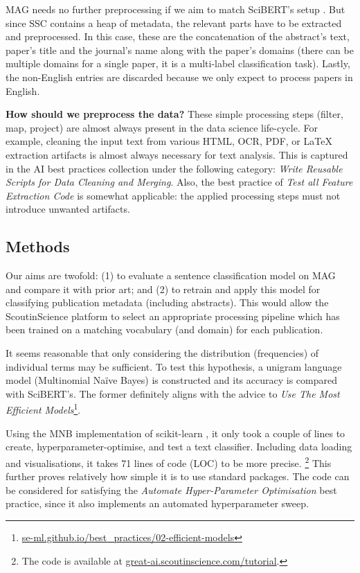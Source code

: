 MAG needs no further preprocessing if we aim to match SciBERT's setup \cite{beltagy2019scibert}. But since SSC contains a heap of metadata, the relevant parts have to be extracted and preprocessed. In this case, these are the concatenation of the abstract's text, paper's title and the journal's name along with the paper's domains (there can be multiple domains for a single paper, it is a multi-label classification task). Lastly, the non-English entries are discarded because we only expect to process papers in  English.

\begin{displayquote}
\textbf{How should we preprocess the data?} These simple processing steps (filter, map, project) are almost always present in the data science life-cycle. For example, cleaning the input text from various HTML, OCR, PDF, or \LaTeX \hskip 0.12cm extraction artifacts is almost always necessary for text analysis. This is captured in the AI best practices collection under the following category: \textit{Write Reusable Scripts for Data Cleaning and Merging}. Also, the best practice of \textit{Test all Feature Extraction Code} is somewhat applicable: the applied processing steps must not introduce unwanted artifacts.
\end{displayquote}

\subsection{Methods}

Our aims are twofold: (1) to evaluate a sentence classification model on MAG and compare it with prior art; and (2) to retrain and apply this model for classifying publication metadata (including abstracts). This would allow the ScoutinScience platform to select an appropriate processing pipeline which has been trained on a matching vocabulary (and domain) for each publication. 

It seems reasonable that only considering the distribution (frequencies) of individual terms may be sufficient. To test this hypothesis, a unigram language model (Multinomial Naïve Bayes) is constructed and its accuracy is compared with SciBERT's. The former definitely aligns with the advice to \textit{Use The Most Efficient Models}\footnote{\href{https://se-ml.github.io/best_practices/02-efficient-models/}{se-ml.github.io/best\_practices/02-efficient-models}}.

Using the MNB implementation of scikit-learn \cite{pedregosa2011scikit}, it only took a couple of lines to create, hyperparameter-optimise, and test a text classifier. Including data loading and visualisations, it takes 71 lines of code (LOC) to be more precise. \footnote{The code is available at \href{https://great-ai.scoutinscience.com/tutorial/}{great-ai.scoutinscience.com/tutorial}.} This further proves relatively how simple it is to use standard packages. The code can be considered for satisfying the \textit{Automate Hyper-Parameter Optimisation} best practice, since it also implements an automated hyperparameter sweep. 

